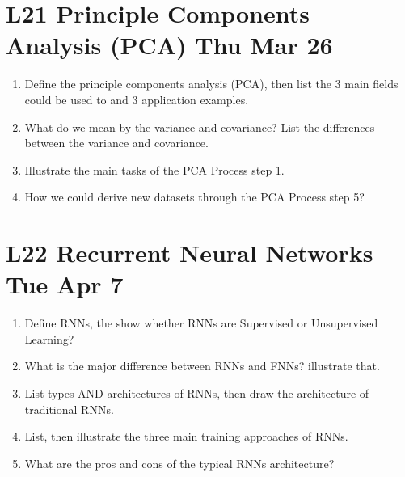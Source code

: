 \documentclass[12pt]{article}
\newenvironment{QandA}{\begin{enumerate}[label=\bfseries\arabic*.]\bfseries}
{\end{enumerate}}
\newenvironment{answered}{\par\normalfont\color{Sepia}}{}
\begin{document}
\section*{L21 Principle Components Analysis (PCA) \textemdash{} Thu Mar 26}
\begin{QandA}
    \item Define the principle components analysis (PCA), then list the 3 main fields could be used to and 3 application examples.
    \begin{answered}
    \end{answered}

    \item What do we mean by the variance and covariance? List the differences between the variance and covariance.
    \begin{answered}
    \end{answered}

    \item Illustrate the main tasks of the PCA Process \textemdash{} step 1.
    \begin{answered}
    \end{answered}

    \item How we could derive new datasets through the PCA Process \textemdash{} step 5?
    \begin{answered}
    \end{answered}

\end{QandA}

\section*{L22 Recurrent Neural Networks \textemdash{} Tue Apr 7}
\begin{QandA}
    \item Define RNNs, the show whether RNNs are Supervised or Unsupervised Learning? 
    \begin{answered}
    \end{answered}

    \item What is the major difference between RNNs and FNNs? illustrate that.
    \begin{answered}
    \end{answered}

    \item List types AND architectures of RNNs, then draw the architecture of traditional RNNs.
    \begin{answered}
    \end{answered}

    \item List, then illustrate the three main training approaches of RNNs.
    \begin{answered}
    \end{answered}

    \item What are the pros and cons of the typical RNNs architecture?
    \begin{answered}
    \end{answered}

\end{QandA}
\end{document}
